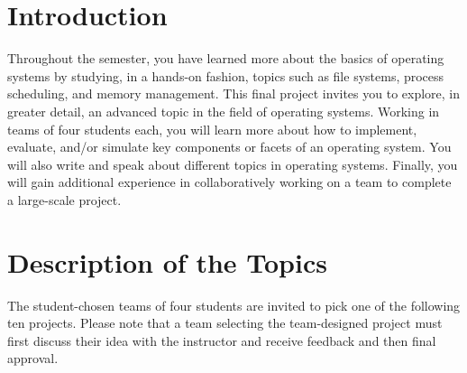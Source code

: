


\usepackage[compact]{titlesec}



\section*{Introduction}

Throughout the semester, you have learned more about the basics of operating systems by studying, in a hands-on fashion,
topics such as file systems, process scheduling, and memory management.  This final project invites you to explore, in
greater detail, an advanced topic in the field of operating systems. Working in teams of four students each, you will
learn more about how to implement, evaluate, and/or simulate key components or facets of an operating system. You will
also write and speak about different topics in operating systems.  Finally, you will gain additional experience in
collaboratively working on a team to complete a large-scale project.

\section*{Description of the Topics}

The student-chosen teams of four students are invited to pick one of the following ten projects.  Please note that a
team selecting the team-designed project must first discuss their idea with the instructor and receive feedback and
then final approval.   


